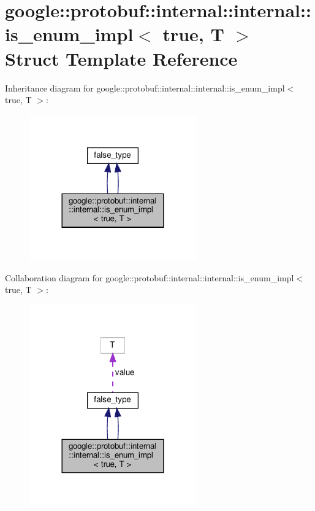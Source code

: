 \hypertarget{structgoogle_1_1protobuf_1_1internal_1_1internal_1_1is__enum__impl_3_01true_00_01T_01_4}{}\section{google\+:\+:protobuf\+:\+:internal\+:\+:internal\+:\+:is\+\_\+enum\+\_\+impl$<$ true, T $>$ Struct Template Reference}
\label{structgoogle_1_1protobuf_1_1internal_1_1internal_1_1is__enum__impl_3_01true_00_01T_01_4}


Inheritance diagram for google\+:\+:protobuf\+:\+:internal\+:\+:internal\+:\+:is\+\_\+enum\+\_\+impl$<$ true, T $>$\+:
\nopagebreak
\begin{figure}[H]
\begin{center}
\leavevmode
\includegraphics[width=204pt]{structgoogle_1_1protobuf_1_1internal_1_1internal_1_1is__enum__impl_3_01true_00_01T_01_4__inherit__graph}
\end{center}
\end{figure}


Collaboration diagram for google\+:\+:protobuf\+:\+:internal\+:\+:internal\+:\+:is\+\_\+enum\+\_\+impl$<$ true, T $>$\+:
\nopagebreak
\begin{figure}[H]
\begin{center}
\leavevmode
\includegraphics[width=204pt]{structgoogle_1_1protobuf_1_1internal_1_1internal_1_1is__enum__impl_3_01true_00_01T_01_4__coll__graph}
\end{center}
\end{figure}
